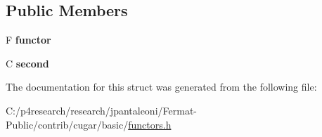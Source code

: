 \subsection*{Public Members}
\begin{DoxyCompactItemize}
\item 
\mbox{\label{structcugar_1_1binder2nd_acbbc6f5ce899df25dd815bf5d09bb55d}} 
F {\bfseries functor}
\item 
\mbox{\label{structcugar_1_1binder2nd_a42ca4cc966ab05226f420e10e5a3a4cc}} 
C {\bfseries second}
\end{DoxyCompactItemize}


The documentation for this struct was generated from the following file\+:\begin{DoxyCompactItemize}
\item 
C\+:/p4research/research/jpantaleoni/\+Fermat-\/\+Public/contrib/cugar/basic/\hyperlink{functors_8h}{functors.\+h}\end{DoxyCompactItemize}
